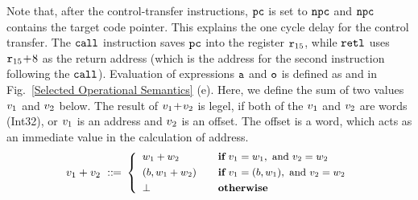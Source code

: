 Note that, after the control-transfer instructions, $\texttt{pc}$ is set
to $\texttt{npc}$ and $\texttt{npc}$ contains the target code pointer. This explains
the one cycle delay for the control transfer.
The $\texttt{call}$ instruction saves $\texttt{pc}$ into the register $\texttt{r}_{15}$,
while $\texttt{retl}$ uses $\texttt{r}_{15} \!+\! 8$ as the
return address (which is the address for the second instruction
following the $\texttt{call}$). Evaluation of
expressions $\texttt{a}$ and $\texttt{o}$ is defined
as 
and 
in Fig.~\ref{Selected Operational Semantics} (e). 
Here, we define the sum of two values $v_1$ 
and $v_2$ below. The result of $v_1\!+\!v_2$ 
is legel, if both of the $v_1$ and $v_2$ 
are words (Int32), or $v_1$ is an address and 
$v_2$ is an offset. The offset is a word, 
which acts as an immediate value in the 
calculation of address.
\[
	\small
	\val_1 + \val_2 \ \define \ 
	\left\{
		\begin{array}{ll}
			\word_1 + \word_2 & \quad \cif \  
				\val_1 = \word_1, \text{ and } 
				\val_2 = \word_2 \\
			\\[-8pt]
			(\block, \word_1 + \word_2) & \quad 
				\cif \ 
				\val_1 = (\block, \word_1), 
				\text{ and } 
				\val_2 = \word_2 \\
			\\[-8pt]
			\perp & \quad \otherwise
		\end{array}
	\right.
\]
%


